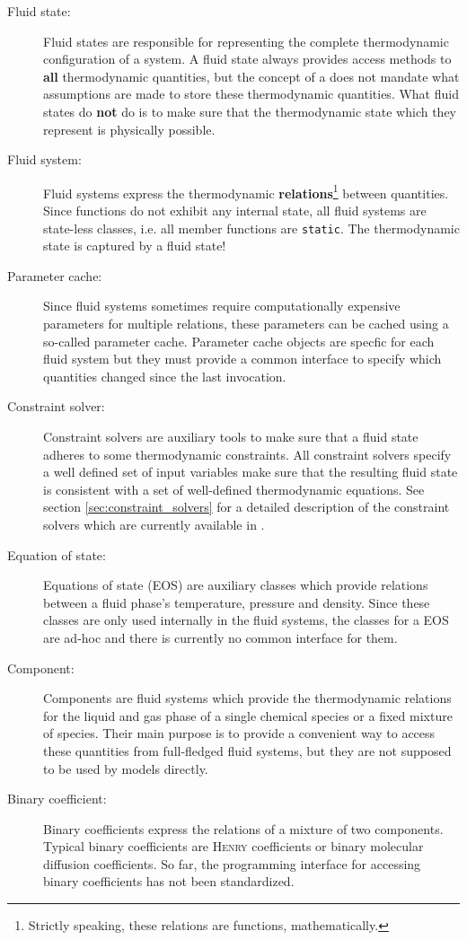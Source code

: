 \begin{description}
\item[Fluid state:] Fluid states are responsible for representing the
  complete thermodynamic configuration of a system. A fluid state
  always provides access methods to {\bf all} thermodynamic
  quantities, but the concept of a does not mandate what assumptions
  are made to store these thermodynamic quantities. What fluid states
  do {\bf not} do is to make sure that the thermodynamic state which
  they represent is physically possible.
\item[Fluid system:] Fluid systems express the thermodynamic {\bf
    relations}\footnote{Strictly speaking, these relations are
    functions, mathematically.} between quantities. Since functions do
  not exhibit any internal state, all fluid systems are state-less
  classes, i.e. all member functions are \texttt{static}. The
  thermodynamic state is captured by a fluid state!
\item[Parameter cache:] Since fluid systems sometimes require
  computationally expensive parameters for multiple relations, these
  parameters can be cached using a so-called parameter
  cache. Parameter cache objects are specfic for each fluid system but
  they must provide a common interface to specify which quantities
  changed since the last invocation.
\item[Constraint solver:] Constraint solvers are auxiliary tools to
  make sure that a fluid state adheres to some thermodynamic
  constraints. All constraint solvers specify a well defined set of
  input variables make sure that the resulting fluid state is
  consistent with a set of well-defined thermodynamic equations. See
  section \ref{sec:constraint_solvers} for a detailed description of
  the constraint solvers which are currently available in \Dumux.
\item[Equation of state:] Equations of state (EOS) are auxiliary
  classes which provide relations between a fluid phase's temperature,
  pressure and density. Since these classes are only used internally
  in the fluid systems, the classes for a EOS are ad-hoc and there is
  currently no common interface for them.
\item[Component:] Components are fluid systems which provide the
  thermodynamic relations for the liquid and gas phase of a single
  chemical species or a fixed mixture of species. Their main purpose
  is to provide a convenient way to access these quantities from
  full-fledged fluid systems, but they are not supposed to be used by
  models directly.
\item[Binary coefficient:] Binary coefficients express the relations
  of a mixture of two components. Typical binary coefficients are
  \textsc{Henry} coefficients or binary molecular diffusion
  coefficients. So far, the programming interface for accessing binary
  coefficients has not been standardized.
\end{description}

